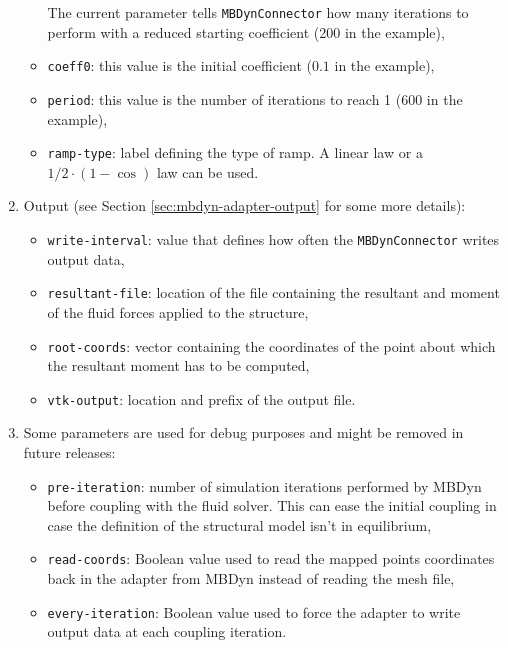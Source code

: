 \begin{enumerate}
\begin{itemize}
        The current parameter tells \texttt{MBDynConnector} how many iterations to perform with a reduced starting coefficient (200 in the example),
        \item \texttt{coeff0}: this value is the initial coefficient ($0.1$ in the example),
        \item \texttt{period}: this value is the number of iterations to reach 1 (600 in the example),
        \item \texttt{ramp-type}: label defining the type of ramp. A linear law or a $1/2 \cdot (1-\cos)$ law can be used.
    \end{itemize}
    \item Output (see Section \ref{sec:mbdyn-adapter-output} for some more details):
    \begin{itemize}
        \item \texttt{write-interval}: value that defines how often the \texttt{MBDynConnector} writes output data,
        \item \texttt{resultant-file}: location of the file containing the resultant and moment of the fluid forces applied to the structure, 
        \item \texttt{root-coords}: vector containing the coordinates of the point about which the resultant moment has to be computed,
        \item \texttt{vtk-output}: location and prefix of the output file. 
    \end{itemize}
    \item Some parameters are used for debug purposes and might be removed in future releases:
    \begin{itemize}
        \item \texttt{pre-iteration}: number of simulation iterations performed by MBDyn before coupling with the fluid solver. This can ease the initial coupling in case the definition of the structural model isn't in equilibrium,
        \item \texttt{read-coords}: Boolean value used to read the mapped points coordinates back in the adapter from MBDyn instead of reading the mesh file,
        \item \texttt{every-iteration}: Boolean value used to force the adapter to write output data at each coupling iteration.
    \end{itemize}
\end{enumerate}


